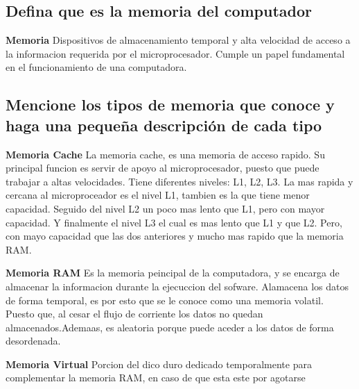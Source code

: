 \documentclass{article}
\begin{document}
	\subsection{Defina que es la memoria del computador}
	
	
	\begin{tcolorbox}[colupper=red!75!black]
		\textbf{Memoria}
		\tcblower
		Dispositivos de almacenamiento temporal y alta velocidad de acceso a la informacion requerida por el microprocesador. Cumple un papel fundamental en el funcionamiento de una computadora.
	\end{tcolorbox}
	
	\subsection{Mencione los tipos de memoria que conoce y haga una pequeña descripción de cada tipo}
	
	\begin{tcolorbox}[colupper=red!75!black]
		\textbf{Memoria Cache}
		\tcblower
		La memoria cache, es una memoria de acceso rapido. Su principal funcion es servir de apoyo al microprocesador, puesto que puede trabajar a altas velocidades. Tiene diferentes niveles: L1, L2, L3. La mas rapida y cercana al microproceador es el nivel L1, tambien es la que tiene menor capacidad. Seguido del nivel L2 un poco mas lento que L1, pero con mayor capacidad. Y finalmente el nivel L3 el cual es mas lento que L1 y que L2. Pero, con mayo capacidad que las dos anteriores y mucho mas rapido que la memoria RAM.
	\end{tcolorbox}
	
	\begin{tcolorbox}[colupper=red!75!black]
		\textbf{Memoria RAM}
		\tcblower
		Es la memoria peincipal de la computadora, y se encarga de almacenar la informacion durante la ejecuccion del sofware. Alamacena los datos de forma temporal, es por esto que se le conoce como una memoria volatil. Puesto que, al cesar el flujo de corriente los datos no quedan almacenados.Ademaas, es aleatoria porque puede aceder a los datos de forma desordenada.
	\end{tcolorbox}
	
	\begin{tcolorbox}[colupper=red!75!black]
		\textbf{Memoria Virtual}
		\tcblower
		Porcion del dico duro dedicado temporalmente para complementar la memoria RAM, en caso de que esta este por agotarse
	\end{tcolorbox}
	
\end{document}
